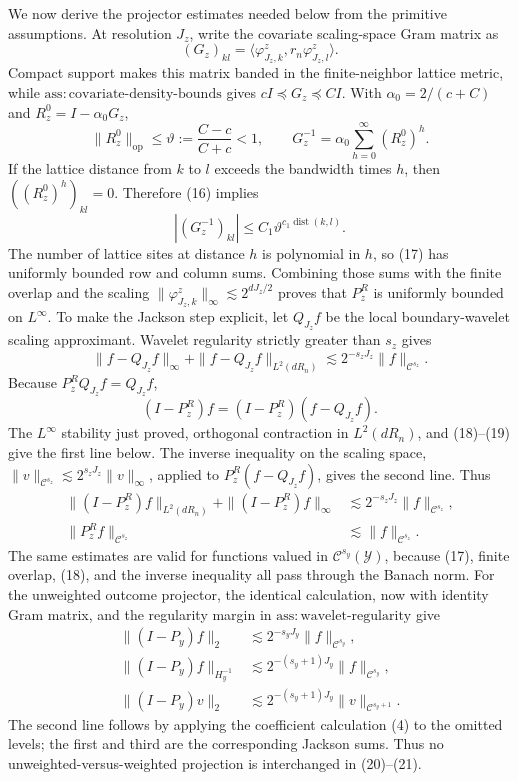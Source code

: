 We now derive the projector estimates needed below from the primitive assumptions.  At resolution \(J_z\), write the covariate scaling-space Gram matrix as
\[
 (G_z)_{kl}=\langle\varphi^z_{J_z,k},r_n\varphi^z_{J_z,l}\rangle.
\]
Compact support makes this matrix banded in the finite-neighbor lattice metric, while \(\mathrm{ass{:}covariate\text{-}density\text{-}bounds}\) gives \(cI\preceq G_z\preceq CI\).  With \(\alpha_0=2/(c+C)\) and \(R_z^0=I-\alpha_0G_z\),
\[
 \|R_z^0\|_{\mathrm{op}}\leq\vartheta:=\frac{C-c}{C+c}<1,
 \qquad G_z^{-1}=\alpha_0\sum_{h=0}^{\infty}(R_z^0)^h. \tag{16}
\]
If the lattice distance from \(k\) to \(l\) exceeds the bandwidth times \(h\), then \(((R_z^0)^h)_{kl}=0\).  Therefore (16) implies
\[
 |(G_z^{-1})_{kl}|\leq C_1\vartheta^{c_1\operatorname{dist}(k,l)}. \tag{17}
\]
The number of lattice sites at distance \(h\) is polynomial in \(h\), so (17) has uniformly bounded row and column sums.  Combining those sums with the finite overlap and the scaling \(\|\varphi^z_{J_z,k}\|_\infty\lesssim2^{dJ_z/2}\) proves that \(P_z^R\) is uniformly bounded on \(L^\infty\).  To make the Jackson step explicit, let \(Q_{J_z}f\) be the local boundary-wavelet scaling approximant.  Wavelet regularity strictly greater than \(s_z\) gives
\[
 \|f-Q_{J_z}f\|_\infty+\|f-Q_{J_z}f\|_{L^2(dR_n)}
 \lesssim2^{-s_zJ_z}\|f\|_{\mathcal C^{s_z}}. \tag{18}
\]
Because \(P_z^R Q_{J_z}f=Q_{J_z}f\),
\[
 (I-P_z^R)f=(I-P_z^R)(f-Q_{J_z}f). \tag{19}
\]
The \(L^\infty\) stability just proved, orthogonal contraction in \(L^2(dR_n)\), and (18)--(19) give the first line below.  The inverse inequality on the scaling space,
\(\|v\|_{\mathcal C^{s_z}}\lesssim2^{s_zJ_z}\|v\|_\infty\), applied to \(P_z^R(f-Q_{J_z}f)\), gives the second line.  Thus
\[
 \begin{split}
 \|(I-P_z^R)f\|_{L^2(dR_n)}+\|(I-P_z^R)f\|_\infty
 &\lesssim2^{-s_zJ_z}\|f\|_{\mathcal C^{s_z}},\\
 \|P_z^Rf\|_{\mathcal C^{s_z}}&\lesssim\|f\|_{\mathcal C^{s_z}}.
 \end{split} \tag{20}
\]
The same estimates are valid for functions valued in \(\mathcal C^{s_y}(\mathcal Y)\), because (17), finite overlap, (18), and the inverse inequality all pass through the Banach norm.  For the unweighted outcome projector, the identical calculation, now with identity Gram matrix, and the regularity margin in \(\mathrm{ass{:}wavelet\text{-}regularity}\) give
\[
 \begin{split}
 \|(I-P_y)f\|_2&\lesssim2^{-s_yJ_y}\|f\|_{\mathcal C^{s_y}},\\
 \|(I-P_y)f\|_{H_y^{-1}}&\lesssim2^{-(s_y+1)J_y}\|f\|_{\mathcal C^{s_y}},\\
 \|(I-P_y)v\|_2&\lesssim2^{-(s_y+1)J_y}\|v\|_{\mathcal C^{s_y+1}}.
 \end{split} \tag{21}
\]
The second line follows by applying the coefficient calculation (4) to the omitted levels; the first and third are the corresponding Jackson sums.  Thus no unweighted-versus-weighted projection is interchanged in (20)--(21).

